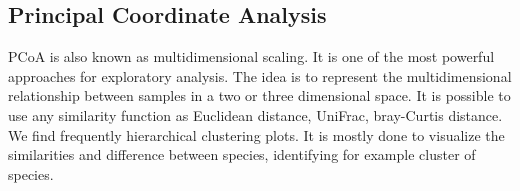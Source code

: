   \subsection{Principal Coordinate Analysis}
  PCoA is also known as multidimensional scaling.
  It is one of the most powerful approaches for exploratory analysis.
  The idea is to represent the multidimensional relationship between samples in a two or three dimensional space.
  It is possible to use any similarity function as Euclidean distance, UniFrac, bray-Curtis distance.
  We find frequently hierarchical clustering plots.
  It is mostly done to visualize the similarities and difference between species, identifying for example cluster of species.
